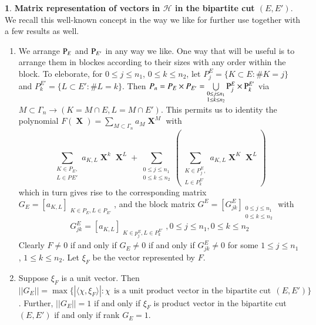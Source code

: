 \documentclass[a4paper,12pt]{article}
\DeclareMathOperator{\x}{\mathrm{X}}
\theoremstyle{definition}
\theoremstyle{underlinethm}
\theoremstyle{definition}
\newtheorem{subsubsec}{}[subsection]
\begin{document}
\begin{subsubsec}
\textbf{Matrix representation of vectors in $\mathcal{H}$ in the bipartite cut $(E, E')$}. We recall this well-known concept in the way we like for further use together with a few results as well.
\begin{enumerate}[label = (\alph*)]
\item We arrange ${\rm P}_{E}$ and ${\rm P}_{E'}$ in any way we like. One way that will be useful is to arrange them in blockes according to their sizes with any order within the block. To eleborate, for $0 \leq j \leq n_{1}$, $0 \leq k \leq n_{2}$, let $P_{j}^{E} = \{K \subset E : \# K =j\}$ and $P_{k}^{E'} = \{L \subset E' : \# L =k\}$. Then $P_{n}= P_{E} \times P_{E'}= \bigcup\limits_{\substack{0 \leq j \leq n_{1}\\ 1 \leq k \leq n_{2}}} {\rm P}_{j}^{E} \times {\rm P}_{k}^{E'}$ via $M \subset \Gamma_{n} \rightarrow (K=M \cap E, L=M \cap E')$. This permits us to identity the polynomial $F(\boldsymbol{\x}) = \sum\limits_{M \subset \Gamma_{n}} a_{M} \boldsymbol{\x}^{M}$ with 
\begin{equation}
\sum_{\substack{K \in P_{E},\\ L \in P_{}E'}} a_{K, L} \boldsymbol{\x}^{k} \boldsymbol{\x}^{L} +  \sum_{\substack{0 \leq j \leq n_{1} \\0 \leq k \leq n_{2}}} \left(\sum_{\substack{K \in P_{j}^{E},\\ L \in P_{k}^{E'}}} a_{K, L} \boldsymbol{\x}^{K} \boldsymbol{\x}^{L} \right)\tag{4.18}\label{eq-4.18}
\end{equation}
which in turn gives rise to the corresponding matrix $G_{E} = [a_{K, L}]_{\substack{K \in P_{E}, L \in P_{E'}}}$, and the block matrix $G^{E} =[G_{jk}^{E}]_{\substack{0 \leq j \leq n_{1}\\ 0 \leq k \leq n_{2}}}$ with 
\begin{equation}
G_{jk}^{E}= [a_{K, L}]_{\substack{K \in p_{j}^{E}, L \in P_{k}^{E'}}}, 0 \leq j \leq n_{1}, 0 \leq k \leq n_{2}\tag{4.19}\label{eq-4.19}
\end{equation}
Clearly $F \neq 0$ if and only if $G_{E} \neq 0$ if and only if $G_{j k}^{E} \neq 0$ for some $1 \leq j \leq n_{1}$, $1 \leq k \leq n_{2}$. Let $\xi_{F}$ be the vector represented by $F$.

\item Suppose $\xi_{F}$ is a unit vector. Then\\ $||G_{E}|| = \max\{| \langle \chi, \xi_{F} \rangle | : \chi~~\text{is a unit product vector in the bipartite cut}~~(E, E')\}$. Further, $||G_{E}||=1$ if and only if $\xi_{F}$ is product vector in the bipartite cut $(E, E')$ if and only if rank $G_{E}=1$.


\end{enumerate}
\end{subsubsec}
\end{document}
